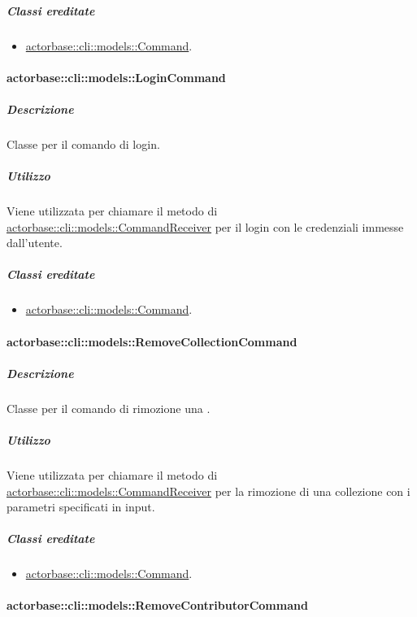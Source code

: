\documentclass{scalatekids-article}
\begin{document}
\subparagraph{Classi ereditate}

\begin{itemize}
\item \hyperref[sec:actorbase::cli::models::Command]{actorbase::cli::models::Command}.
\end{itemize}

\paragraph{actorbase::cli::models::LoginCommand}
\label{sec:actorbase::cli::models::LoginCommand}

\subparagraph{Descrizione}

Classe per il comando di login.

\subparagraph{Utilizzo}

Viene utilizzata per chiamare il metodo di
\hyperref[sec:actorbase::cli::models::CommandReceiver]{actorbase::cli::models::CommandReceiver} per il login con le credenziali
immesse dall'utente.

\subparagraph{Classi ereditate}

\begin{itemize}
\item \hyperref[sec:actorbase::cli::models::Command]{actorbase::cli::models::Command}.
\end{itemize}

\paragraph{actorbase::cli::models::RemoveCollectionCommand}
\label{sec:actorbase::cli::models::RemoveCollectionCommand}

\subparagraph{Descrizione}

Classe per il comando di rimozione una .

\subparagraph{Utilizzo}

Viene utilizzata per chiamare il metodo di
\hyperref[sec:actorbase::cli::models::CommandReceiver]{actorbase::cli::models::CommandReceiver} per la rimozione di una collezione con
i parametri specificati in input.

\subparagraph{Classi ereditate}

\begin{itemize}
\item \hyperref[sec:actorbase::cli::models::Command]{actorbase::cli::models::Command}.
\end{itemize}

\paragraph{actorbase::cli::models::RemoveContributorCommand}
\label{sec:actorbase::cli::models::RemoveContributorCommand}
\end{document}
